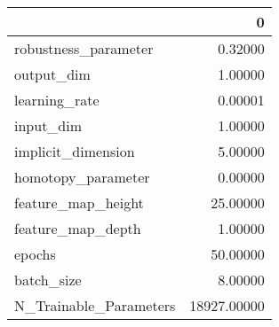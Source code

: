 \begin{tabular}{lr}
\toprule
{} &            0 \\
\midrule
robustness\_parameter   &      0.32000 \\
output\_dim             &      1.00000 \\
learning\_rate          &      0.00001 \\
input\_dim              &      1.00000 \\
implicit\_dimension     &      5.00000 \\
homotopy\_parameter     &      0.00000 \\
feature\_map\_height     &     25.00000 \\
feature\_map\_depth      &      1.00000 \\
epochs                 &     50.00000 \\
batch\_size             &      8.00000 \\
N\_Trainable\_Parameters &  18927.00000 \\
\bottomrule
\end{tabular}
